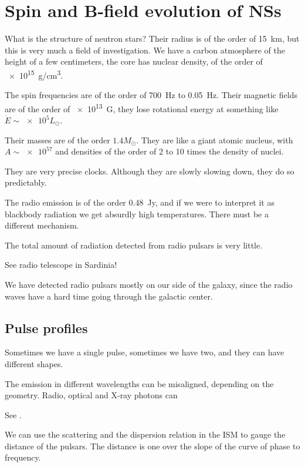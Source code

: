\documentclass[main.tex]{subfiles}
\begin{document}

\section{Spin and B-field evolution of NSs}

What is the structure of neutron stars? 
Their radius is of the order of \SI{15}{km}, but this is very much a field of investigation. 
We have a carbon atmosphere of the height of a few centimeters, 
the core has nuclear density, of the order of \SI{e15}{g/cm^3}. 

The spin frequencies are of the order of \SI{700}{Hz} to \SI{.05}{Hz}. 
Their magnetic fields are of the order of \SI{e13}{G}, they lose rotational energy at something like \(\dot{E} \sim \num{e5} L_{\odot}\). 

Their masses are of the order \(\num{1.4}M_{\odot}\). 
They are like a giant atomic nucleus, with \(A \sim \num{e57}\) and densities of the order of 2 to 10 times the density of nuclei. 

They are very precise clocks. Although they are slowly slowing down, they do so predictably. 

The radio emission is of the order \SI{.48}{Jy}, and if we were to interpret it as blackbody radiation we get absurdly high temperatures. 
There must be a different mechanism. 

The total amount of radiation detected from radio pulsars is very little. 

See radio telescope in Sardinia!

We have detected radio pulsars mostly on our side of the galaxy, since the radio waves have a hard time going through the galactic center.

\subsection{Pulse profiles} 

Sometimes we have a single pulse, sometimes we have two, and they can have different shapes. 

The emission in different wavelengths can be misaligned, depending on the geometry. 
Radio, optical and X-ray photons can 

See \cite[]{shapiroBlackHolesWhite1983}.

We can use the scattering and the dispersion relation in the ISM to gauge the distance of the pulsars. The distance is one over the slope of the curve of phase to frequency. 
\end{document}
